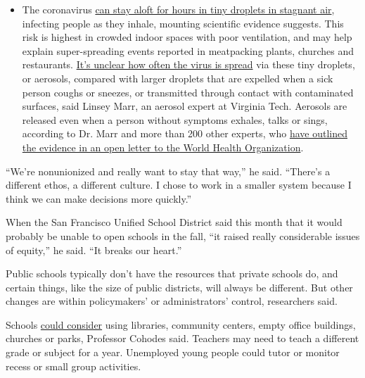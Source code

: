 \begin{itemize}
  \begin{itemize}
  \tightlist
  \item
    The coronavirus
    \href{https://www.nytimes.com/2020/07/04/health/239-experts-with-one-big-claim-the-coronavirus-is-airborne.html?action=click\&pgtype=Article\&state=default\&region=MAIN_CONTENT_3\&context=storylines_faq}{can
    stay aloft for hours in tiny droplets in stagnant air}, infecting
    people as they inhale, mounting scientific evidence suggests. This
    risk is highest in crowded indoor spaces with poor ventilation, and
    may help explain super-spreading events reported in meatpacking
    plants, churches and restaurants.
    \href{https://www.nytimes.com/2020/07/06/health/coronavirus-airborne-aerosols.html?action=click\&pgtype=Article\&state=default\&region=MAIN_CONTENT_3\&context=storylines_faq}{It's
    unclear how often the virus is spread} via these tiny droplets, or
    aerosols, compared with larger droplets that are expelled when a
    sick person coughs or sneezes, or transmitted through contact with
    contaminated surfaces, said Linsey Marr, an aerosol expert at
    Virginia Tech. Aerosols are released even when a person without
    symptoms exhales, talks or sings, according to Dr. Marr and more
    than 200 other experts, who
    \href{https://academic.oup.com/cid/article/doi/10.1093/cid/ciaa939/5867798}{have
    outlined the evidence in an open letter to the World Health
    Organization}.
  \end{itemize}
\end{itemize}

``We're nonunionized and really want to stay that way,'' he said.
``There's a different ethos, a different culture. I chose to work in a
smaller system because I think we can make decisions more quickly.''

When the San Francisco Unified School District said this month that it
would probably be unable to open schools in the fall, ``it raised really
considerable issues of equity,'' he said. ``It breaks our heart.''

Public schools typically don't have the resources that private schools
do, and certain things, like the size of public districts, will always
be different. But other changes are within policymakers' or
administrators' control, researchers said.

Schools
\href{https://www.theatlantic.com/ideas/archive/2020/07/better-fall-possible/613882/}{could
consider} using libraries, community centers, empty office buildings,
churches or parks, Professor Cohodes said. Teachers may need to teach a
different grade or subject for a year. Unemployed young people could
tutor or monitor recess or small group activities.

